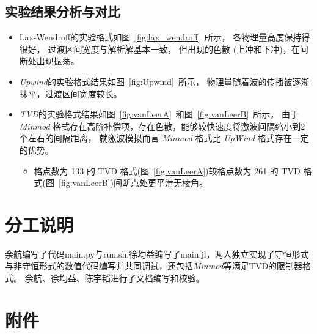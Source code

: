 \documentclass[10.5pt
]{article}
\begin{document}
\subsection{实验结果分析与对比}




\begin{itemize}
	\item
Lax-Wendroff的实验格式如图~\ref{fig:lax_wendroff}~所示，
各物理量高度保持得很好，
过渡区间宽度与解析解基本一致，
但出现的色散 (上冲和下冲)，在间断处出现振荡。

\item
\textit{Upwind}的实验格式结果如图~\ref{fig:Upwind}~所示，
物理量随着波的传播被逐渐抹平，过渡区间宽度较长。

\item
\textit{TVD}的实验格式结果如图~\ref{fig:vanLeerA}~和图~\ref{fig:vanLeerB}~所示，
由于 \textit{Minmod} 格式存在高阶补偿项，存在色散，能够较快速度将激波间隔缩小到2个左右的间隔距离，
就激波模拟而言 \textit{Minmod} 格式比 \textit{UpWind} 格式存在一定的优势。
\begin{itemize}
	\item 格点数为 133 的 TVD 格式(图~\ref{fig:vanLeerA})较格点数为 261 的 TVD 格式(图~\ref{fig:vanLeerB})间断点处更平滑无棱角。
\end{itemize}

\end{itemize}
\section{分工说明}
余航编写了代码main.py与run.sh,徐均益编写了main.jl，两人独立实现了守恒形式与非守恒形式的数值代码编写并共同调试，还包括\textit{Minmod}等满足TVD的限制器格式。
 余航、徐均益、陈宇韬进行了文档编写和校验。
\section{附件}
\end{document}
